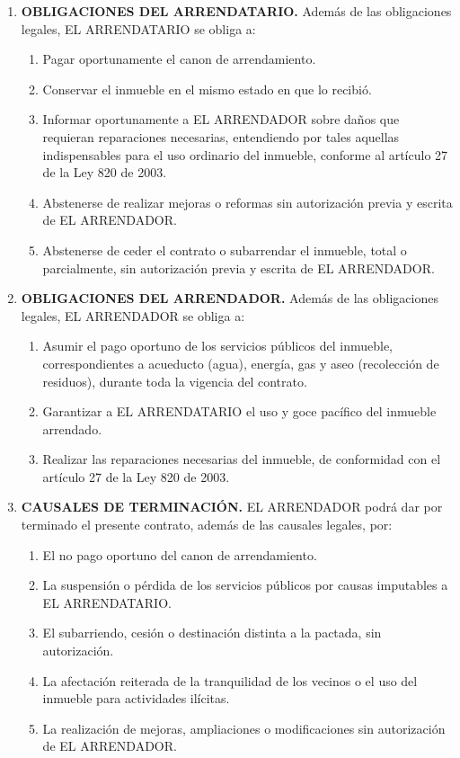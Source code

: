 \documentclass[12pt,letterpaper]{article}
\begin{document}
\begin{enumerate}[label=\textbf{CLÁUSULA \Roman*.}, wide, labelindent=0pt, itemsep=0.4cm]
\item \textbf{OBLIGACIONES DEL ARRENDATARIO.} Además de las obligaciones legales, EL ARRENDATARIO se obliga a:
\begin{enumerate}[label=\alph*)]
    \item Pagar oportunamente el canon de arrendamiento.
    \item Conservar el inmueble en el mismo estado en que lo recibió.
    \item Informar oportunamente a EL ARRENDADOR sobre daños que requieran reparaciones necesarias, entendiendo por tales aquellas indispensables para el uso ordinario del inmueble, conforme al artículo 27 de la Ley 820 de 2003.
    \item Abstenerse de realizar mejoras o reformas sin autorización previa y escrita de EL ARRENDADOR.
    \item Abstenerse de ceder el contrato o subarrendar el inmueble, total o parcialmente, sin autorización previa y escrita de EL ARRENDADOR.
\end{enumerate}

\item \textbf{OBLIGACIONES DEL ARRENDADOR.} Además de las obligaciones legales, EL ARRENDADOR se obliga a:
\begin{enumerate}[label=\alph*)]
    \item Asumir el pago oportuno de los servicios públicos del inmueble, correspondientes a acueducto (agua), energía, gas y aseo (recolección de residuos), durante toda la vigencia del contrato.
    \item Garantizar a EL ARRENDATARIO el uso y goce pacífico del inmueble arrendado.
    \item Realizar las reparaciones necesarias del inmueble, de conformidad con el artículo 27 de la Ley 820 de 2003.
\end{enumerate}



\item \textbf{CAUSALES DE TERMINACIÓN.} EL ARRENDADOR podrá dar por terminado el presente contrato, además de las causales legales, por:
\begin{enumerate}[label=\arabic*)]
    \item El no pago oportuno del canon de arrendamiento.
    \item La suspensión o pérdida de los servicios públicos por causas imputables a EL ARRENDATARIO.
    \item El subarriendo, cesión o destinación distinta a la pactada, sin autorización.
    \item La afectación reiterada de la tranquilidad de los vecinos o el uso del inmueble para actividades ilícitas.
    \item La realización de mejoras, ampliaciones o modificaciones sin autorización de EL ARRENDADOR.
\end{enumerate}


\end{enumerate}
\end{document}
